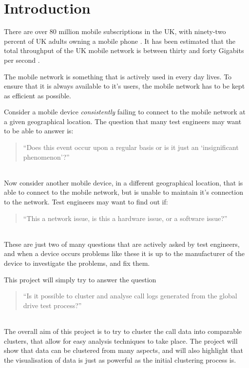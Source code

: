 \chapter{Introduction}

There are over 80 million mobile subscriptions in the UK, with ninety-two 
percent of UK adults owning a mobile phone \citep{ofcom:online}. It has been
estimated that the total throughput of the UK mobile network is between thirty
and forty Gigabits per second \citep{webb10}. 

The mobile network is something that is actively used in every day lives. To 
ensure that it is always available to it's users, the mobile network has to be 
kept as efficient as possible.

Consider a mobile device {\em consistently} failing to connect to the mobile 
network at a given geographical location. The question that many test engineers 
may want to be able to answer is:

\begin{quote}
  ``Does this event occur upon a regular basis or is it just an `insignificant 
    phenomenon'?'' 
\end{quote}
~\\
Now consider another mobile device, in a different geographical location, that 
is able to connect to the mobile network, but is unable to maintain it's 
connection to the network. Test engineers may want to find out if:

\begin{quote}
  ``This a network issue, is this a hardware issue, or a software issue?''
\end{quote}
~\\
These are just two of many questions that are actively asked by test engineers, 
and when a device occurs problems like these it is up to the manufacturer of 
the device to investigate the problems, and fix them.

This project will simply try to answer the question
\begin{quote}
  ``Is it possible to cluster and analyse call logs generated from the global 
    drive test process?''
\end{quote}
~\\
The overall aim of this project is to try to cluster the call data into 
comparable clusters, that allow for easy analysis techniques to take place. The 
project will show that data can be clustered from many aspects, and will also 
highlight that the visualisation of data is just as powerful as the initial 
clustering process is.

